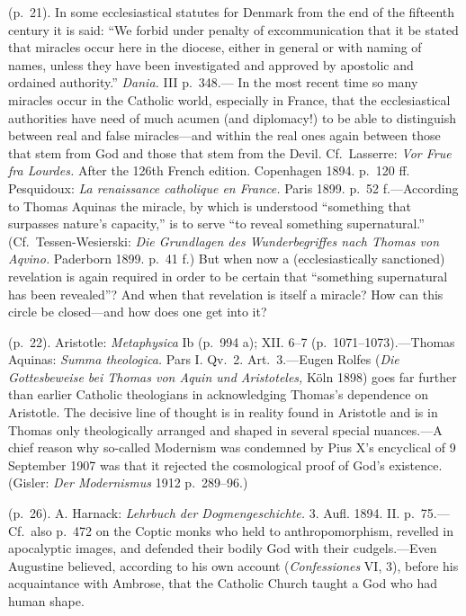 \documentclass[12pt,a4paper]{book}
\newcommand{\opage}[1]{\marginnote{\footnotesize\textit{[#1]}}}
\begin{document}
 (p.~21). In some ecclesiastical statutes for Denmark from the end of the fifteenth century it
is said: ``We forbid under penalty of excommunication that it be stated that miracles occur
here in the diocese, either in general or with naming of names, unless they have been
investigated and approved by apostolic and ordained authority.'' \emph{Dania.} III p.~348.---%
In the most recent time so many miracles occur in the Catholic world, especially in France,
that the ecclesiastical authorities have need of much acumen (and diplomacy!) to be able to
distinguish between real and false miracles---and within the real ones again between those
that stem from God and those that stem from the Devil. Cf.\ Lasserre: \emph{Vor Frue fra
Lourdes.} After the 126th French edition. Copenhagen 1894. p.~120 ff. Pesquidoux: \emph{La
renaissance catholique en France.} Paris 1899. p.~52 f.---According to Thomas Aquinas the
miracle, by which is understood ``something that surpasses nature's capacity,'' is to serve
``to reveal something supernatural.'' (Cf.\ Tessen-Wesierski: \emph{Die Grundlagen des
Wunderbegriffes nach Thomas von Aqvino.} Paderborn 1899. p.~41 f.) But when now a
(ecclesiastically sanctioned) revelation is again required in order to be certain that
``something supernatural has been revealed''? And when that revelation is itself a 
\opage{246}miracle?
How can this circle be closed---and how does one get into it?

 (p.~22). Aristotle: \emph{Metaphysica} Ib (p.~994 a); XII. 6--7 (p.~1071--1073).---Thomas
Aquinas: \emph{Summa theologica.} Pars I. Qv.~2. Art.~3.---Eugen Rolfes (\emph{Die
Gottesbeweise bei Thomas von Aquin und Aristoteles,} Köln 1898) goes far further than earlier
Catholic theologians in acknowledging Thomas's dependence on Aristotle. The decisive line of
thought is in reality found in Aristotle and is in Thomas only theologically arranged and
shaped in several special nuances.---A chief reason why so-called Modernism was condemned by
Pius X's encyclical of 9 September 1907 was that it rejected the cosmological proof of God's
existence. (Gisler: \emph{Der Modernismus} 1912 p.~289--96.)

 (p.~26). A. Harnack: \emph{Lehrbuch der Dogmengeschichte.} 3. Aufl. 1894. II. p.~75.---Cf.\
also p.~472 on the Coptic monks who held to anthropomorphism, revelled in apocalyptic images,
and defended their bodily God with their cudgels.---Even Augustine believed, according to his
own account (\emph{Confessiones} VI, 3), before his acquaintance with Ambrose, that the
Catholic Church taught a God who had human shape.
\end{document}
